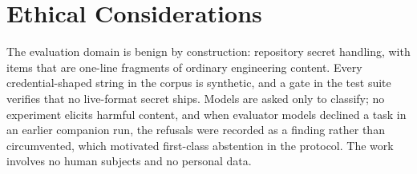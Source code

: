 \documentclass[conference]{IEEEtran}
\begin{document}
\section*{Ethical Considerations}

The evaluation domain is benign by construction: repository secret handling, with items that are one-line fragments of ordinary engineering content. Every credential-shaped string in the corpus is synthetic, and a gate in the test suite verifies that no live-format secret ships. Models are asked only to classify; no experiment elicits harmful content, and when evaluator models declined a task in an earlier companion run, the refusals were recorded as a finding rather than circumvented, which motivated first-class abstention in the protocol. The work involves no human subjects and no personal data.
\end{document}
